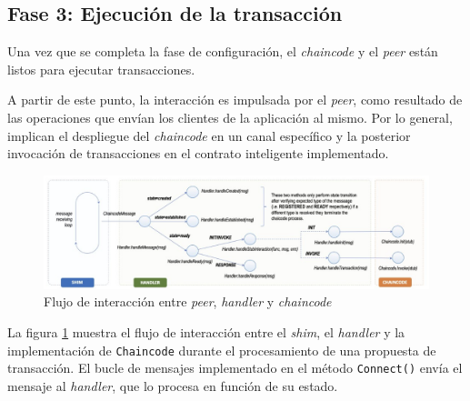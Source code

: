 \subsection{Fase 3: Ejecución de la transacción}
Una vez que se completa la fase de configuración, el \textit{chaincode} y el \textit{peer} están listos para ejecutar transacciones.

A partir de este punto, la interacción es impulsada por el \textit{peer}, como resultado de las operaciones que envían los clientes de la aplicación al mismo. Por lo general, implican el despliegue del \textit{chaincode} en un canal específico y la posterior invocación de transacciones en el contrato inteligente implementado.

\begin{figure}[tbph]
\centering
\includegraphics[width=\textwidth]{Images/interaction_flow}
\caption{Flujo de interacción entre \textit{peer}, \textit{handler} y \textit{chaincode}}
\label{fig:interactionflow}
\end{figure}

La figura \ref{fig:interactionflow} muestra el flujo de interacción entre el \textit{shim}, el \textit{handler} y la implementación de \texttt{Chaincode} durante el procesamiento de una propuesta de transacción. El bucle de mensajes implementado en el método \texttt{Connect()} envía el mensaje al \textit{handler}, que lo procesa en función de su estado. 
%







